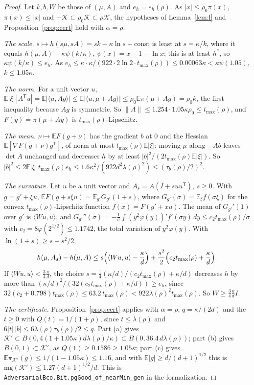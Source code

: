 \documentclass[11pt]{amsart}
\theoremstyle{definition}
\numberwithin{equation}{section}
\newcommand{\E}{\mathbb{E}}
\newcommand{\cK}{\mathcal{K}}
\newcommand{\ip}[1]{\langle #1\rangle}
\begin{document}
\begin{proof}
Let $k,b,W$ be those of $(\mu,A)$ and $e_h=e_h(\rho)$. As $|x|\le\rho_0\pi(x)$, $\pi(x)\le|x|$ and $-\cK\subset\rho_0\cK\subset\rho\cK$, the hypotheses of Lemma~\ref{lem:l} and Proposition~\ref{prop:cert} hold with $\alpha=\rho$.

\emph{The scale.} $s\mapsto h(s\mu,sA)=sk-\kappa\ln s+\mathrm{const}$ is least at $s=\kappa/k$, where it equals $h(\mu,A)-\kappa\psi(k/\kappa)$, $\psi(x)=x-1-\ln x$; this is at least $h^*$, so $\kappa\psi(k/\kappa)\le e_h$. As $e_h\le\kappa\cdot\kappa/(922\cdot2\ln2\cdot t_{\max}(\rho))\le0.00063\kappa<\kappa\psi(1.05)$, $k\le1.05\kappa$.

\emph{The norm.} For a unit vector $u$, $\E|\xi|\,|A^{\mathsf T}u|=\E|\ip{u,Ag}|\le\E|\ip{u,\mu+Ag}|\le\rho_0\E\pi(\mu+Ag)=\rho_0k$, the first inequality because $Ag$ is symmetric. So $\|A\|\le1.254\cdot1.05\kappa\rho_0\le t_{\max}(\rho)$, and $F(y)=\pi(\mu+Ay)$ is $t_{\max}(\rho)$-Lipschitz.

\emph{The mean.} $\nu\mapsto\E F(g+\nu)$ has the gradient $b$ at $0$ and the Hessian $\E[\nabla F(g+\nu)g^{\mathsf T}]$, of norm at most $t_{\max}(\rho)\E|\xi|$; moving $\mu$ along $-Ab$ leaves $\det A$ unchanged and decreases $h$ by at least $|b|^2/(2t_{\max}(\rho)\E|\xi|)$. So $|b|^2\le2\E|\xi|\,t_{\max}(\rho)e_h\le1.6\kappa^2/(922d^2\lambda(\rho)^2)\le(\tau_b(\rho)/2)^2$.

\emph{The curvature.} Let $u$ be a unit vector and $A_s=A(I+suu^{\mathsf T})$, $s\ge0$. With $g=g'+\xi u$, $\E F(g+s\xi u)=\E_{g'}G_{g'}(1+s)$, where $G_{g'}(\sigma)=\E_\xi f(\sigma\xi)$ for the convex $t_{\max}(\rho)$-Lipschitz function $f(x)=F(g'+xu)$. The mean of $G_{g'}'(1)$ over $g'$ is $\ip{Wu,u}$, and $G_{g'}''(\sigma)=-\frac1\sigma\int(y^2\varphi(y))'f'(\sigma y)\,dy\le c_2t_{\max}(\rho)/\sigma$ with $c_2=8\varphi(2^{1/2})\le1.1742$, the total variation of $y^2\varphi(y)$. With $\ln(1+s)\ge s-s^2/2$,
\[
h(\mu,A_s)-h(\mu,A)\le s\Bigl(\ip{Wu,u}-\frac\kappa d\Bigr)+\frac{s^2}2\Bigl(c_2t_{\max}(\rho)+\frac\kappa d\Bigr).
\]
If $\ip{Wu,u}<\frac34\frac\kappa d$, the choice $s=\frac14(\kappa/d)/(c_2t_{\max}(\rho)+\kappa/d)$ decreases $h$ by more than $(\kappa/d)^2/(32(c_2t_{\max}(\rho)+\kappa/d))\ge e_h$, since $32(c_2+0.798)t_{\max}(\rho)\le63.2\,t_{\max}(\rho)<922\lambda(\rho)^2t_{\max}(\rho)$. So $W\ge\frac34\frac\kappa dI$.

\emph{The certificate.} Proposition~\ref{prop:cert} applies with $\alpha=\rho$, $q=\kappa/(2d)$ and the $t\ge0$ with $Q(t)=1/(1+\rho)$, since $t\le\lambda(\rho)$ and $6|t|\,|b|\le6\lambda(\rho)\tau_b(\rho)/2\le q$. Part (a) gives $\cK'\subset B(0,4(1+1.05\kappa)d\lambda(\rho)/\kappa)\subset B(0,36.4\,d\lambda(\rho))$; part (b) gives $B(0,1)\subset\cK'$, as $Q(1)\ge0.1586\ge1.05\kappa$; part (c) gives $\E\pi_{\cK'}(g)\le1/(1-1.05\kappa)\le1.16$, and with $\E|g|\ge d/(d+1)^{1/2}$ this is $\mathrm{mg}(\cK')\le1.27(d+1)^{1/2}/d$.
This is \texttt{AdversarialBco.Bit.pgGood\_of\_nearMin\_gen} in the formalization.
\end{proof}
\end{document}
